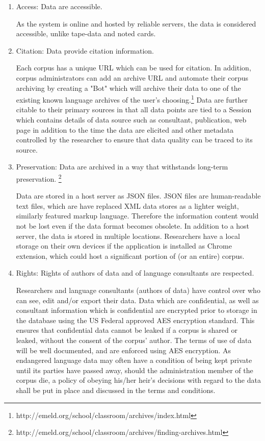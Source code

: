 \documentclass[12 pt]{article}
\begin{document}
\begin{enumerate}
\item Access: Data are accessible. 

As the system is online and hosted by reliable servers, the data is considered accessible, unlike tape-data and noted cards.




\item Citation: Data provide citation information.

Each corpus has a unique URL which can be used for citation. In addition, corpus administrators can add an archive URL and automate their corpus archiving by creating a "Bot" which will archive their data to one of the existing known language archives of the user's choosing.\footnote{http://emeld.org/school/classroom/archives/index.html} Data are further citable to their primary sources in that all data points are tied to a Session which contains details of data source such as consultant, publication, web page in addition to the time the data are elicited  and other metadata controlled by the researcher to ensure that data quality can be traced to its source. 

\item Preservation: Data are archived in a way that withstands long-term preservation.  \footnote{http://emeld.org/school/classroom/archives/finding-archives.html}

Data are stored in a host server as JSON files. JSON files are human-readable text files, which are have replaced XML data stores as a lighter weight, similarly featured markup language. Therefore the information content would not be lost even if the data format becomes obsolete.  
In addition to a host server, the data is stored in multiple locations. Researchers have a local storage on their own devices if the application is installed as Chrome extension, which could host a significant portion of (or an entire) corpus. 


\item Rights: Rights of authors of data and of language consultants are respected. 

Researchers and language consultants (authors of data) have control over who can see, edit and/or export their data. Data which are confidential, as well as consultant information which is confidential are encrypted prior to storage in the database using the US Federal approved AES encryption standard. This ensures that confidential data cannot be leaked if a corpus is shared or leaked, without the consent of the corpus' author.  The terms of use of data will be well documented, and are enforced using AES encryption. As endangered language data may often have a condition of being kept private until its parties have passed away, should the administration member of the corpus die, a policy of obeying his/her heir's decisions with regard to the data shall be put in place and discussed in the terms and conditions. 

\end{enumerate} 
\end{document}
